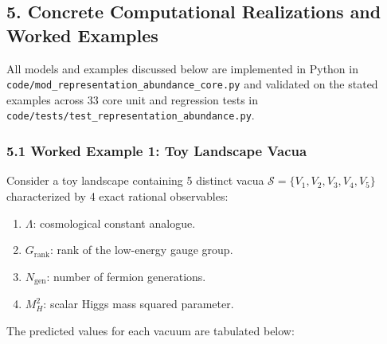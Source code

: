 \documentclass[
  10pt,
]{article}
\begin{document}
\subsection{5. Concrete Computational Realizations and Worked Examples}\label{concrete-computational-realizations-and-worked-examples}

All models and examples discussed below are implemented in Python in \texttt{code/mod\_representation\_abundance\_core.py} and validated on the stated examples across 33 core unit and regression tests in \texttt{code/tests/test\_representation\_abundance.py}.

\subsubsection{5.1 Worked Example 1: Toy Landscape Vacua}\label{worked-example-1-toy-landscape-vacua}

Consider a toy landscape containing 5 distinct vacua \hypertarget{math-E0177-0250}{}{\(\mathcal{S} = \{V_1, V_2, V_3, V_4, V_5\}\)} characterized by 4 exact rational observables:

\begin{enumerate}
\def\labelenumi{\arabic{enumi}.}
\item
  \hypertarget{math-E0178-0251}{}{\(\Lambda\)}: cosmological constant analogue.
\item
  \hypertarget{math-E0179-0252}{}{\(G_{\text{rank}}\)}: rank of the low-energy gauge group.
\item
  \hypertarget{math-E0180-0253}{}{\(N_{\text{gen}}\)}: number of fermion generations.
\item
  \hypertarget{math-E0181-0254}{}{\(M_H^2\)}: scalar Higgs mass squared parameter.
\end{enumerate}

The predicted values for each vacuum are tabulated below:
\end{document}
